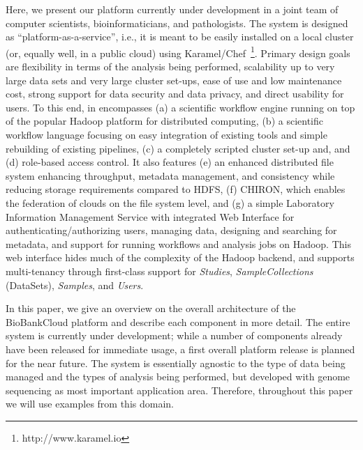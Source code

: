 Here, we present our platform currently under development in a joint team of computer scientists, bioinformaticians, and pathologists. The system is designed as ``platform-as-a-service'', i.e., it is meant to be easily installed on a local cluster (or, equally well, in a public cloud) using Karamel/Chef~\footnote{http://www.karamel.io}. Primary design goals are flexibility in terms of the analysis being performed, scalability up to very large data sets and very large cluster set-ups, ease of use and low maintenance cost, strong support for data security and data privacy, and direct usability for users. To this end, in encompasses (a) a scientific workflow engine running on top of the popular Hadoop platform for distributed computing, (b) a scientific workflow language focusing on easy integration of existing tools and simple rebuilding of existing pipelines, (c) a completely scripted cluster set-up and, and (d) role-based access control. It also features (e) an enhanced distributed file system enhancing throughput, metadata management, and consistency while reducing storage requirements compared to HDFS, (f) CHIRON, which enables the federation of clouds on the file system level, and (g) a simple Laboratory Information Management Service with integrated Web Interface for authenticating/authorizing users, managing data, designing and searching for metadata, and support for running workflows and analysis jobs on Hadoop. This web interface hides much of the complexity of the Hadoop backend, and supports multi-tenancy through first-class support for \textit{Studies}, \textit{SampleCollections} (DataSets), \textit{Samples}, and \textit{Users}. 

In this paper, we give an overview on the overall architecture of the BioBankCloud platform and describe each component in more detail. The entire system is currently under development; while a number of components already have been released for immediate usage, a first overall platform release is planned for the near future. The system is essentially agnostic to the type of data being managed and the types of analysis being performed, but developed with genome sequencing as most important application area. Therefore, throughout this paper we will use examples from this domain. 